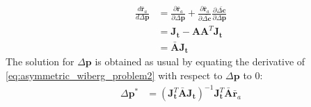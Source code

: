 \begin{equation}
    \begin{aligned}
        \frac{d \bar{\mathbf{r}}_a}{d \Delta \mathbf{p}} & = \frac{\partial \bar{\mathbf{r}}_a}{\partial \Delta \mathbf{p}} + \frac{\partial \bar{\mathbf{r}}_a}{\partial \bar{\Delta \mathbf{c}}} \frac{\partial \bar{\Delta \mathbf{c}}}{\partial \Delta \mathbf{p}}
        \\
        & = \mathbf{J}_{\mathbf{t}} - \mathbf{A}\mathbf{A}^T\mathbf{J}_{\mathbf{t}}
        \\
        & = \bar{\mathbf{A}}\mathbf{J}_{\mathbf{t}}
    \label{eq:asymmetric_wiberg_jacobian}
    \end{aligned}
\end{equation}
 The solution for $\Delta\mathbf{p}$ is obtained as usual by equating the derivative of \ref{eq:asymmetric_wiberg_problem2} with respect to $\Delta\mathbf{p}$ to 0:
 \begin{equation}
    \begin{aligned}
    	\Delta \mathbf{p}^* & = \left( \mathbf{J}_{\mathbf{t}}^T \bar{\mathbf{A}} \mathbf{J}_{\mathbf{t}} \right)^{-1} \mathbf{J}_{\mathbf{t}}^T \bar{\mathbf{A}} \bar{\mathbf{r}}_a
    \label{eq:asymmetric_wiberg_solution}
    \end{aligned}
\end{equation}

